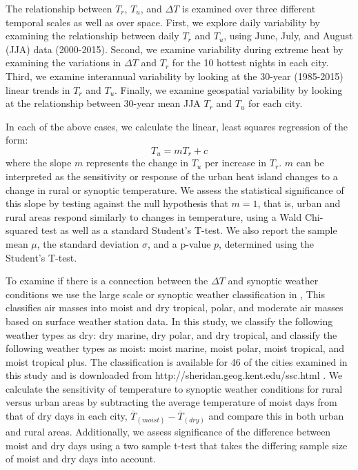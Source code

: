 \documentclass[12pt]{iopart}
\begin{document}
{%
The relationship between $T_r$, $T_u$, and $\Delta T$ is examined over three different temporal scales as well as over space. First, we explore daily variability by examining the relationship between daily $T_r$ and $T_{u}$, using June, July, and August (JJA) data (2000-2015). Second, we examine variability during extreme heat by examining the variations in $\Delta T$ and $T_{r}$ for the 10 hottest nights in each city. Third, we examine interannual variability by looking at the 30-year (1985-2015) linear trends in $T_r$ and $ T_u$. Finally, we examine geospatial variability by looking at the relationship between 30-year mean JJA $T_r$ and $T_u$ for each city. 

In each of the above cases, we calculate %
the linear, least squares regression of the form:
\begin{equation} \label{eq1}
T_u = m {T_{r}} + c
\end{equation}
where the slope $m$ represents the change in  $T_u$ per increase in $T_{r}$. $m$ can be interpreted as the sensitivity or response of the urban heat island changes to a change in rural or synoptic temperature.  We assess the statistical significance of this slope by testing against the null hypothesis that $m=1$, that is, urban and rural areas respond similarly to changes in temperature, using a Wald Chi-squared test as well as a standard Student's T-test. We also report the sample mean $\mu$, the standard deviation $\sigma$, and a p-value $p$, determined using the Student's T-test.

To examine if there is a connection between the  $\Delta T$ and synoptic weather conditions we use the large scale or synoptic weather classification in ,
 This classifies air masses into moist and dry tropical, polar, and moderate air masses based on surface weather station data. In this study, we classify the following weather types as dry: dry marine, dry polar, and dry tropical, and classify the following weather types as moist: moist marine, moist polar, moist tropical, and moist tropical plus. The classification is available for 46 of the cities examined in this study and is downloaded from http://sheridan.geog.kent.edu/ssc.html . We calculate the sensitivity of temperature to synoptic weather conditions for rural versus urban areas 
by subtracting the average temperature of moist days from that of dry days in each city, $\overline{T}_( {moist})  -  \overline{T}_( {dry} ) $ and compare this in both urban and rural areas. Additionally, we assess significance of the difference between moist and dry days using a two sample t-test that takes the differing sample size of moist and dry days into account. 
 
}
\end{document}

